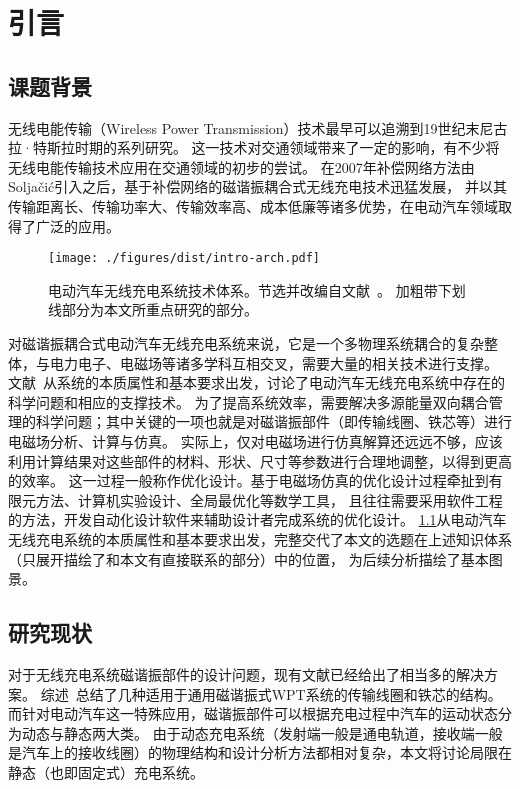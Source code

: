\documentclass[index]{subfiles}
\begin{document}
\chapter{引言}\label{sec:intro}
\section{课题背景}
无线电能传输（Wireless Power Transmission）技术最早可以追溯到19世纪末尼古拉·特斯拉时期的系列研究\cite{barrett1894}。
这一技术对交通领域带来了一定的影响，有不少将无线电能传输技术应用在交通领域的初步的尝试\cite{eghtesadi1990}。
在2007年补偿网络方法由Solja\v{c}i\'c引入\cite{kurs2007}之后，基于补偿网络的磁谐振耦合式无线充电技术迅猛发展，
并以其传输距离长、传输功率大、传输效率高、成本低廉等诸多优势，在电动汽车领域取得了广泛的应用\cite{高大威2015}。

\begin{figure}[htb]
  \centering
  \texttt{[image: ./figures/dist/intro-arch.pdf]}
  \caption[电动汽车无线充电系统技术体系]{电动汽车无线充电系统技术体系。节选并改编自文献~。
  加粗带下划线部分为本文所重点研究的部分。\label{fig:intro-arch}}
\end{figure}

对磁谐振耦合式电动汽车无线充电系统来说，它是一个多物理系统耦合的复杂整体，与电力电子、电磁场等诸多学科互相交叉，需要大量的相关技术进行支撑。
文献~从系统的本质属性和基本要求出发，讨论了电动汽车无线充电系统中存在的科学问题和相应的支撑技术。
为了提高系统效率，需要解决多源能量双向耦合管理的科学问题；其中关键的一项也就是对磁谐振部件（即传输线圈、铁芯等）进行电磁场分析、计算与仿真。
实际上，仅对电磁场进行仿真解算还远远不够，应该利用计算结果对这些部件的材料、形状、尺寸等参数进行合理地调整，以得到更高的效率。
这一过程一般称作优化设计。基于电磁场仿真的优化设计过程牵扯到有限元方法、计算机实验设计、全局最优化等数学工具，
且往往需要采用软件工程的方法，开发自动化设计软件来辅助设计者完成系统的优化设计。
\cref{fig:intro-arch}从电动汽车无线充电系统的本质属性和基本要求出发，完整交代了本文的选题在上述知识体系（只展开描绘了和本文有直接联系的部分）中的位置，
为后续分析描绘了基本图景。

\section{研究现状}
对于无线充电系统磁谐振部件的设计问题，现有文献已经给出了相当多的解决方案。
综述~总结了几种适用于通用磁谐振式WPT系统的传输线圈和铁芯的结构。
而针对电动汽车这一特殊应用，磁谐振部件可以根据充电过程中汽车的运动状态分为动态与静态两大类\cite{赵争鸣2016}。
由于动态充电系统（发射端一般是通电轨道，接收端一般是汽车上的接收线圈）的物理结构和设计分析方法都相对复杂，本文将讨论局限在静态（也即固定式）充电系统。
\end{document}
